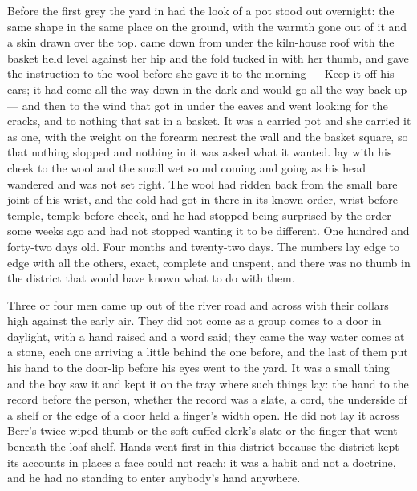 
Before the first grey the yard in  had the look of a pot stood out overnight: the same shape in the same place on the ground, with the warmth gone out of it and a skin drawn over the top.  came down from under the kiln-house roof with the basket held level against her hip and the fold tucked in with her thumb, and gave the instruction to the wool before she gave it to the morning --- Keep it off his ears; it had come all the way down in the dark and would go all the way back up --- and then to the wind that got in under the eaves and went looking for the cracks, and to nothing that sat in a basket. It was a carried pot and she carried it as one, with the weight on the forearm nearest the wall and the basket square, so that nothing slopped and nothing in it was asked what it wanted.  lay with his cheek to the wool and the small wet sound coming and going as his head wandered and was not set right. The wool had ridden back from the small bare joint of his wrist, and the cold had got in there in its known order, wrist before temple, temple before cheek, and he had stopped being surprised by the order some weeks ago and had not stopped wanting it to be different. One hundred and forty-two days old. Four months and twenty-two days. The numbers lay edge to edge with all the others, exact, complete and unspent, and there was no thumb in the district that would have known what to do with them.

Three or four men came up out of the river road and across  with their collars high against the early air. They did not come as a group comes to a door in daylight, with a hand raised and a word said; they came the way water comes at a stone, each one arriving a little behind the one before, and the last of them put his hand to the door-lip before his eyes went to the yard. It was a small thing and the boy saw it and kept it on the tray where such things lay: the hand to the record before the person, whether the record was a slate, a cord, the underside of a shelf or the edge of a door held a finger's width open. He did not lay it across Berr's twice-wiped thumb or the soft-cuffed clerk's slate or the finger that went beneath the loaf shelf. Hands went first in this district because the district kept its accounts in places a face could not reach; it was a habit and not a doctrine, and he had no standing to enter anybody's hand anywhere.

